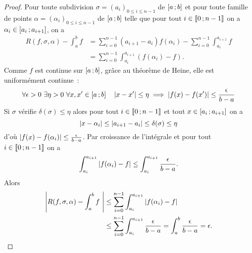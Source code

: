 \begin{proof}
  Pour toute subdivision $\sigma=(a_i)_{0 \leq i \leq n-1}$ de $\left[ a \, ;  b \right]$ et pour toute famille de points $\alpha=(\alpha_i)_{0 \leq i \leq n-1}$ de $\left[ a \, ;  b \right]$ telle que pour tout $i \in \mathopen{\llbracket}0\mathclose{}\mathpunct{};n-1\mathclose{\rrbracket}$ on a $\alpha_i \in \left[ a_i \, ;  a_{i+1} \right]$, on a
  \begin{align}
    R(f,\sigma,\alpha)- \int_a^b f &= \sum_{i=0}^{n-1}(a_{i+1}-a_i)f(\alpha_i) - \sum_{i=0}^{n-1} \int_{a_i}^{a_{i+1}} f \\
    &=\sum_{i=0}^{n-1} \int_{a_i}^{a_{i+1}} (f(\alpha_i)-f).
  \end{align}
  Comme $f$ est continue sur $\left[ a \, ;  b \right]$, grâce au théorème de Heine, elle est uniformément continue~:
  \begin{equation}
    \forall \epsilon >0 \ \exists \eta >0 \ \forall x,x' \in \intervalleff{a}{b} \quad \abs{x-x'} \leq \eta \implies \abs{f(x)-f(x')} \leq \frac{\epsilon}{b-a}
  \end{equation}
  Si $\sigma$ vérifie $\delta(\sigma) \leq \eta$ alors pour tout $i \in \mathopen{\llbracket}0\mathclose{}\mathpunct{};n-1\mathclose{\rrbracket}$ et tout $x \in \left[ a_i \, ;  a_{i+1} \right]$ on a
  \begin{equation}
    \left\lvert x-\alpha_i\right\rvert \leq \left\lvert a_{i+1}-a_i\right\rvert \leq \delta(\sigma) \leq \eta
  \end{equation}
  d'où $\left\lvert f(x)-f(\alpha_i)\right\rvert \leq \frac{\epsilon}{b-a}$. Par croissance de l'intégrale et pour tout $i \in \mathopen{\llbracket}0\mathclose{}\mathpunct{};n-1\mathclose{\rrbracket}$ on a
  \begin{equation}
    \int_{a_i}^{a_{i+1}} \left\lvert f(\alpha_i)-f\right\rvert \leq \int_{a_i}^{a_{i+1}}\frac{\epsilon}{b-a}.
  \end{equation}
  Alors
  \begin{align}
    \left\lvert R(f,\sigma,\alpha)- \int_a^b f~\right\rvert &\leq \sum_{i=0}^{n-1} \int_{a_i}^{a_{i+1}} \left\lvert f(\alpha_i)-f\right\rvert \\
    &\leq \sum_{i=0}^{n-1} \int_{a_i}^{a_{i+1}}\frac{\epsilon}{b-a} = \int_a^b \frac{\epsilon}{b-a}=\epsilon.
  \end{align}
\end{proof}

